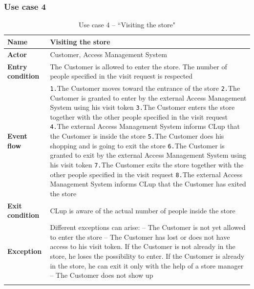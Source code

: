 \documentclass[a4paper,oneside,11pt]{book}   %
\begin{document}
    \subsubsection{Use case 4}
    \begin{longtable}[c] { |>{\bfseries{}}C{0.25\textwidth}|V{0.55\textwidth}| }
        \hline
        Name            & Visiting the store \\ \hline
        Actor           & Customer, Access Management System \\ \hline
        Entry condition & The Customer is allowed to enter the store. The number of people specified in the visit request is respected  \\ \hline
        Event flow      & 
        \texttt{1.}The Customer moves toward the entrance of the store \newline
        \texttt{2.}The Customer is granted to enter by the external Access Management System using his visit token \newline
        \texttt{3.}The Customer enters the store together with the other people specified in the visit request \newline
        \texttt{4.}The external Access Management System informs CLup that the Customer is inside the store \newline
        \texttt{5.}The Customer does his shopping and is going to exit the store \newline
        \texttt{6.}The Customer is granted to exit by the external Access Management System using his visit token \newline
        \texttt{7.}The Customer exits the store together with the other people specified in the visit request \newline
        \texttt{8.}The external Access Management System informs CLup that the Customer has exited the store
        \\ \hline
        Exit condition  & CLup is aware of the actual number of people inside the store \\ \hline
        Exception       & Different exceptions can arise: \newline
        -- The Customer is not yet allowed to enter the store \newline
        -- The Customer has lost or does not have access to his visit token. If the Customer is not already in the store, he loses the possibility to enter. If the Customer is already in the store, he can exit it only with the help of a store manager \newline
        -- The Customer does not show up \\
        \hline
    \caption{Use case 4 -- ``Visiting the store"}
    \label{table:use_case_04}
    \end{longtable}
    
\end{document}
